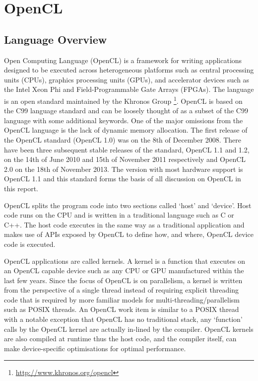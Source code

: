 \section{OpenCL}

\subsection{Language Overview}

Open Computing Language (OpenCL) is a framework for writing applications
designed to be executed across heterogeneous platforms such as central
processing units (CPUs), graphics processing units (GPUs), and accelerator
devices such as the Intel Xeon Phi and Field-Programmable Gate Arrays (FPGAs).
The language is an open standard maintained by the Khronos Group
\footnote{\url{http://www.khronos.org/opencl}}. OpenCL is based on the C99
language standard \cite{c99standard} and can be loosely thought of as a subset
of the C99 language with some additional keywords. One of the major omissions
from the OpenCL language is the lack of dynamic memory allocation. The first
release of the OpenCL standard (OpenCL 1.0) was on the 8th of December 2008.
There have been three subsequent stable releases of the standard, OpenCL 1.1 and
1.2, on the 14th of June 2010 and 15th of November 2011 respectively and OpenCL
2.0 on the 18th of November 2013. The version with most hardware support is
OpenCL 1.1 \cite{opencl1.1} and
this standard forms the basis of all discussion on OpenCL in this report.

OpenCL splits the program code into two sections called `host' and `device'.
Host code runs on the CPU and is written in a traditional language such as C or
C++. The host code executes in the same way as a traditional application and
makes use of APIs exposed by OpenCL to define how, and where, OpenCL device code
is executed.

OpenCL applications are called kernels. A kernel is a function that executes on
an OpenCL capable device such as any CPU or GPU manufactured within the last few
years. Since the focus of OpenCL is on parallelism, a kernel is written from the
perspective of a single thread instead of requiring explicit threading code that
is required by more familiar models for multi-threading/parallelism such as
POSIX threads. An OpenCL work item is similar to a POSIX thread with a notable
exception that OpenCL has no traditional stack, any `function' calls by the
OpenCL kernel are actually in-lined by the compiler. OpenCL kernels are also
compiled at runtime thus the host code, and the compiler itself, can make
device-specific optimisations for optimal performance.

